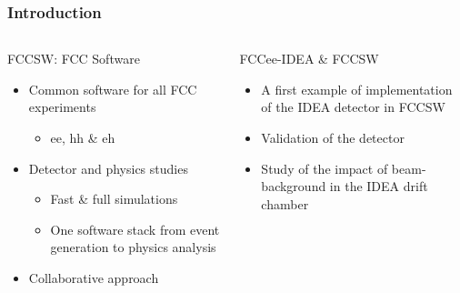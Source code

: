 \documentclass[aspectratio=169, hyperref={colorlinks=true,pdfpagelabels=false,linkcolor=black}, xcolor=dvipsnames,10pt]{beamer}
\begin{document}
\begin{frame}
	\frametitle{Introduction}
	

        \begin{columns}
          \begin{block}{FCCSW: FCC Software}
            \begin{itemize}
            \item Common software for all FCC experiments
              \begin{itemize}
              \item ee, hh \& eh
              \end{itemize}
            \item Detector and physics studies
              \begin{itemize}
              \item Fast \& full simulations
              \item One software stack from event generation to physics analysis
              \end{itemize}
            \item Collaborative approach
            \end{itemize}
          \end{block}

          \begin{block}{FCCee-IDEA \& FCCSW}
            \begin{itemize}
            \item A first example of implementation of the IDEA
              detector in FCCSW
            \item Validation of the detector
            \item Study of the impact of beam-background in the IDEA
              drift chamber 
            \end{itemize}
          \end{block}


\end{columns}
\end{frame}
\end{document}
